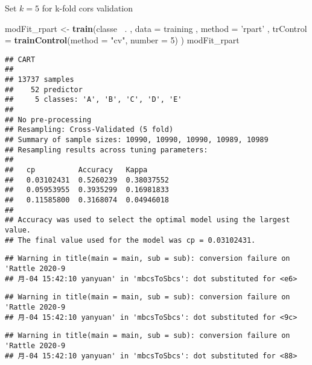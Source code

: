 \documentclass[
]{article}
\newenvironment{Shaded}{\begin{snugshade}}{\end{snugshade}}
\newcommand{\DataTypeTok}[1]{\textcolor[rgb]{0.13,0.29,0.53}{#1}}
\newcommand{\DecValTok}[1]{\textcolor[rgb]{0.00,0.00,0.81}{#1}}
\newcommand{\KeywordTok}[1]{\textcolor[rgb]{0.13,0.29,0.53}{\textbf{#1}}}
\newcommand{\NormalTok}[1]{#1}
\newcommand{\OperatorTok}[1]{\textcolor[rgb]{0.81,0.36,0.00}{\textbf{#1}}}
\newcommand{\StringTok}[1]{\textcolor[rgb]{0.31,0.60,0.02}{#1}}
\begin{document}
Set \(k=5\) for k-fold cors validation

\begin{Shaded}
\begin{Highlighting}[]
\NormalTok{modFit_rpart <-}\StringTok{ }\KeywordTok{train}\NormalTok{(classe }\OperatorTok{~}\NormalTok{.}
\NormalTok{                     , }\DataTypeTok{data =}\NormalTok{ training}
\NormalTok{                     , }\DataTypeTok{method =} \StringTok{'rpart'}
\NormalTok{                     , }\DataTypeTok{trControl =} \KeywordTok{trainControl}\NormalTok{(}\DataTypeTok{method =} \StringTok{"cv"}\NormalTok{, }\DataTypeTok{number =} \DecValTok{5}\NormalTok{)}
\NormalTok{                      )}
\NormalTok{modFit_rpart}
\end{Highlighting}
\end{Shaded}

\begin{verbatim}
## CART 
## 
## 13737 samples
##    52 predictor
##     5 classes: 'A', 'B', 'C', 'D', 'E' 
## 
## No pre-processing
## Resampling: Cross-Validated (5 fold) 
## Summary of sample sizes: 10990, 10990, 10990, 10989, 10989 
## Resampling results across tuning parameters:
## 
##   cp          Accuracy   Kappa     
##   0.03102431  0.5260239  0.38037552
##   0.05953955  0.3935299  0.16981833
##   0.11585800  0.3168074  0.04946018
## 
## Accuracy was used to select the optimal model using the largest value.
## The final value used for the model was cp = 0.03102431.
\end{verbatim}

\begin{Shaded}
\end{Shaded}

\begin{verbatim}
## Warning in title(main = main, sub = sub): conversion failure on 'Rattle 2020-9
## 月-04 15:42:10 yanyuan' in 'mbcsToSbcs': dot substituted for <e6>
\end{verbatim}

\begin{verbatim}
## Warning in title(main = main, sub = sub): conversion failure on 'Rattle 2020-9
## 月-04 15:42:10 yanyuan' in 'mbcsToSbcs': dot substituted for <9c>
\end{verbatim}

\begin{verbatim}
## Warning in title(main = main, sub = sub): conversion failure on 'Rattle 2020-9
## 月-04 15:42:10 yanyuan' in 'mbcsToSbcs': dot substituted for <88>
\end{verbatim}
\end{document}
